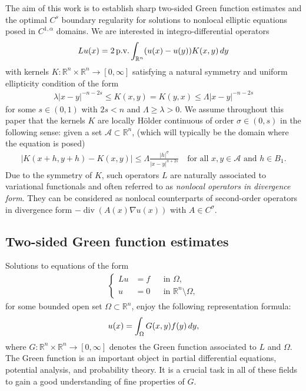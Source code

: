 \documentclass[11pt,reqno]{amsart}
\theoremstyle{plain}
\theoremstyle{definition}
\numberwithin{equation}{section}
\newcommand{\R}{\mathbb{R}}
\newcommand{\1}{\mathbbm{1}}
\DeclareMathOperator{\dvg}{div}
\renewcommand{\d}{\textnormal{\,d}}
\begin{document}
The aim of this work is to establish sharp two-sided Green function estimates and the optimal $C^s$ boundary regularity for solutions to nonlocal elliptic equations posed in $C^{1,\alpha}$ domains. We are interested in integro-differential operators
\begin{align}\label{eq-op}
Lu(x) = 2\, \text{p.v.} \int_{\R^n} (u(x) - u(y)) K(x,y) \d y
\end{align}
with kernels $K : \R^n \times \R^n \to [0,\infty]$ satisfying a natural symmetry and uniform ellipticity condition of the form
\begin{align}
\label{eq:Kcomp}
\lambda |x-y|^{-n-2s} \le K(x,y) = K(y,x) \le \Lambda |x-y|^{-n-2s} 
\end{align}
for some $s \in (0,1)$ with $2s < n$ and $\Lambda \geq \lambda > 0$. We assume throughout this paper that the kernels $K$ are locally H\"older continuous of order $\sigma \in (0,s)$ in the following sense: given a set $\mathcal{A} \subset \R^n$, (which will typically be the domain where the equation is posed)
\begin{align}\label{eq-K-cont} 
|K(x+h, y+h) - K(x, y)| \leq \Lambda \frac{|h|^{\sigma}}{|x-y|^{n+2s}} \quad\text{for all } x,y \in \mathcal{A}\text{ and } h \in B_1.
\end{align}
Due to the symmetry of $K$, such operators $L$ are naturally associated to variational functionals and often referred to as \textit{nonlocal operators in divergence form}. They can be considered as nonlocal counterparts of second-order operators in divergence form $-\dvg(A(x)\nabla u(x))$ with $A \in C^{\sigma}$. 


\subsection{Two-sided Green function estimates}

Solutions to equations of the form
\begin{align}
\label{eq:dirichlet-intro}
\left\{
\begin{aligned}
    L u &= f &&\text{in } \Omega,\\
    u &= 0 &&\text{in } \R^n \setminus \Omega,
\end{aligned}
\right.
\end{align}
for some bounded open set $\Omega \subset \R^n$, enjoy the following representation formula:
\begin{align*}
    u(x) = \int_{\Omega} G(x,y) f(y) \d y,
\end{align*}
where $G : \R^n \times \R^n \to [0,\infty]$ denotes the Green function associated to $L$ and $\Omega$. The Green function is an important object in partial differential equations, potential analysis, and probability theory. It is a crucial task in all of these fields to gain a good understanding of fine properties of $G$. 
\end{document}
